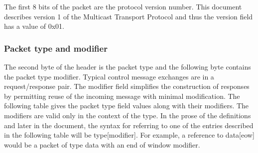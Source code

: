 \documentclass[11pt]{article}
\begin{document}
   The first 8 bits of the packet are the protocol version number. This
   document describes version 1 of the Multicast Transport Protocol and
   thus the version field has a value of 0x01.

\hypertarget{packet-type-modifier}{\subsubsection{Packet type and modifier}}

   The second byte of the header is the packet type and the following
   byte contains the packet type modifier. Typical control message
   exchanges are in a request/response pair. The modifier field
   simplifies the construction of responses by permitting reuse of the
   incoming message with minimal modification. The following table gives
   the packet type field values along with their modifiers. The
   modifiers are valid only in the context of the type. In the prose of
   the definitions and later in the document, the syntax for referring
   to one of the entries described in the following table will be
   type[modifier]. For example, a reference to data[eow] would be a
   packet of type data with an end of window modifier.
\end{document}
